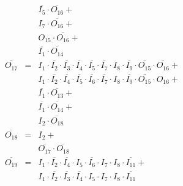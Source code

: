 \documentclass[a4paper,russian]{report}
\begin{document}
\begin{eqnarray*}
	& &  \overline{I_{5}} \cdotp \overline{O_{16}} + \\
	& &  I_{7} \cdotp \overline{O_{16}} + \\
	& &  O_{15} \cdotp \overline{O_{16}} + \\
	& &  \overline{I_{1}} \cdotp \overline{O_{14}} \\
    \overline{O_{17}} & = & I_{1} \cdotp \overline{I_{2}} \cdotp \overline{I_{3}} \cdotp \overline{I_{4}} \cdotp \overline{I_{5}} \cdotp \overline{I_{7}} \cdotp I_{8} \cdotp \overline{I_{9}} \cdotp \overline{O_{15}} \cdotp \overline{O_{16}} + \\
	& &  I_{1} \cdotp \overline{I_{2}} \cdotp \overline{I_{4}} \cdotp \overline{I_{5}} \cdotp \overline{I_{6}} \cdotp \overline{I_{7}} \cdotp I_{8} \cdotp \overline{I_{9}} \cdotp \overline{O_{15}} \cdotp O_{16} + \\
	& &  \overline{I_{1}} \cdotp \overline{O_{13}} + \\
	& &  \overline{I_{1}} \cdotp \overline{O_{14}} + \\
	& &  I_{2} \cdotp \overline{O_{18}} \\
    \overline{O_{18}} & = & I_{2} + \\
	& &  \overline{O_{17}} \cdotp \overline{O_{18}} \\
    \overline{O_{19}} & = & I_{1} \cdotp \overline{I_{2}} \cdotp \overline{I_{4}} \cdotp I_{5} \cdotp \overline{I_{6}} \cdotp I_{7} \cdotp I_{8} \cdotp \overline{I_{11}} + \\
	& &  I_{1} \cdotp \overline{I_{2}} \cdotp \overline{I_{3}} \cdotp \overline{I_{4}} \cdotp I_{5} \cdotp I_{7} \cdotp I_{8} \cdotp \overline{I_{11}} \\
 \end{eqnarray*}
\pagebreak[1]
\end{document}
